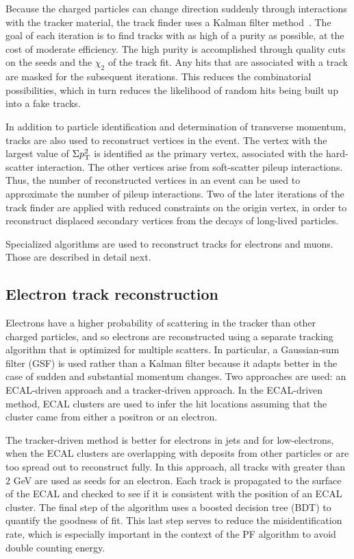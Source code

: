 Because the charged particles can change direction suddenly through interactions with the tracker material, the track finder uses a Kalman filter method~\cite{Kalman}. The goal of each iteration is to find tracks with as high of a purity as possible, at the cost of moderate efficiency. The high purity is accomplished through quality cuts on the seeds and the $\chi_2$ of the track fit. Any hits that are associated with a track are masked for the subsequent iterations. This reduces the combinatorial possibilities, which in turn reduces the likelihood of random hits being built up into a fake tracks. 

In addition to particle identification and determination of transverse momentum, tracks are also used to reconstruct vertices in the event. 
The vertex with the largest value of $\Sigma p_{\mathrm{T}}^2$ is identified as the primary vertex, associated with the hard-scatter interaction. The other vertices arise from soft-scatter pileup interactions. Thus, the number of reconstructed vertices in an event can be used to approximate the number of pileup interactions. Two of the later iterations of the track finder are applied with reduced constraints on the origin vertex, in order to reconstruct displaced secondary vertices from the decays of long-lived particles. 

Specialized algorithms are used to reconstruct tracks for electrons and muons. Those are described in detail next.

\subsection{Electron track reconstruction}
\label{sec:eleTrackReco}

Electrons have a higher probability of scattering in the tracker than other charged particles, and so electrons are reconstructed using a separate tracking algorithm that is optimized for multiple scatters. In particular, a Gaussian-sum filter (GSF) is used rather than a Kalman filter because it adapts better in the case of sudden and substantial momentum changes. Two approaches are used: an ECAL-driven approach and a tracker-driven approach. In the ECAL-driven method, ECAL clusters are used to infer the hit locations assuming that the cluster came from either a positron or an electron. 

The tracker-driven method is better for electrons in jets and for low-\pt electrons, when the ECAL clusters are overlapping with deposits from other particles or are too spread out to reconstruct fully. In this approach, all tracks with \pt greater than 2 GeV are used as seeds for an electron. Each track is propagated to the surface of the ECAL and checked to see if it is consistent with the position of an ECAL cluster. The final step of the algorithm uses a boosted decision tree (BDT) to quantify the goodness of fit. This last step serves to reduce the misidentification rate, which is especially important in the context of the PF algorithm to avoid double counting energy.


